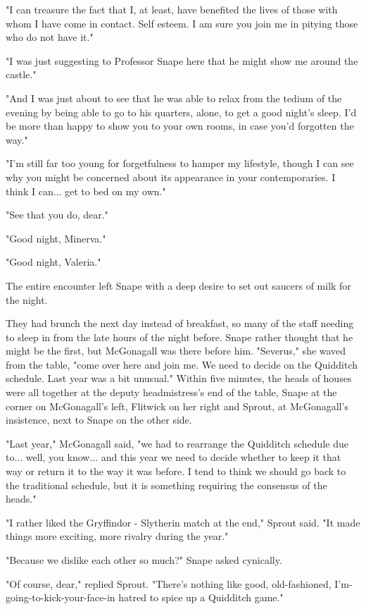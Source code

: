 "I can treasure the fact that I, at least, have benefited the lives of those with whom I have come in contact. Self esteem. I am sure you join me in pitying those who do not have it."

"I was just suggesting to Professor Snape here that he might show me around the castle."

"And I was just about to see that he was able to relax from the tedium of the evening by being able to go to his quarters, alone, to get a good night's sleep. I'd be more than happy to show you to your own rooms, in case you'd forgotten the way."

"I'm still far too young for forgetfulness to hamper my lifestyle, though I can see why you might be concerned about its appearance in your contemporaries. I think I can... get to bed on my own."

"See that you do, dear."

"Good night, Minerva."

"Good night, Valeria."

The entire encounter left Snape with a deep desire to set out saucers of milk for the night.

They had brunch the next day instead of breakfast, so many of the staff needing to sleep in from the late hours of the night before. Snape rather thought that he might be the first, but McGonagall was there before him. "Severus," she waved from the table, "come over here and join me. We need to decide on the Quidditch schedule. Last year was a bit unusual." Within five minutes, the heads of houses were all together at the deputy headmistress's end of the table, Snape at the corner on McGonagall's left, Flitwick on her right and Sprout, at McGonagall's insistence, next to Snape on the other side.

"Last year," McGonagall said, "we had to rearrange the Quidditch schedule due to... well, you know... and this year we need to decide whether to keep it that way or return it to the way it was before. I tend to think we should go back to the traditional schedule, but it is something requiring the consensus of the heads."

"I rather liked the Gryffindor - Slytherin match at the end," Sprout said. "It made things more exciting, more rivalry during the year."

"Because we dislike each other so much?" Snape asked cynically.

"Of course, dear," replied Sprout. "There's nothing like good, old-fashioned, I'm-going-to-kick-your-face-in hatred to spice up a Quidditch game."

